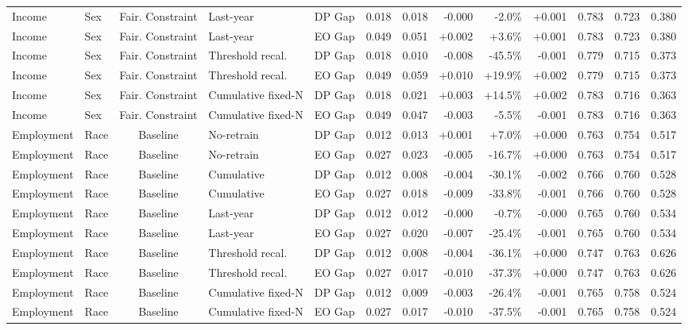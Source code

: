 \begin{longtable}{llcllrrrrrrrr}
Income & Sex & Fair. Constraint & Last-year & DP Gap & 0.018 & 0.018 & -0.000 & -2.0\% & +0.001 & 0.783 & 0.723 & 0.380 \\
Income & Sex & Fair. Constraint & Last-year & EO Gap & 0.049 & 0.051 & +0.002 & +3.6\% & +0.001 & 0.783 & 0.723 & 0.380 \\
Income & Sex & Fair. Constraint & Threshold recal. & DP Gap & 0.018 & 0.010 & -0.008 & -45.5\% & -0.001 & 0.779 & 0.715 & 0.373 \\
Income & Sex & Fair. Constraint & Threshold recal. & EO Gap & 0.049 & 0.059 & +0.010 & +19.9\% & +0.002 & 0.779 & 0.715 & 0.373 \\
Income & Sex & Fair. Constraint & Cumulative fixed-N & DP Gap & 0.018 & 0.021 & +0.003 & +14.5\% & +0.002 & 0.783 & 0.716 & 0.363 \\
Income & Sex & Fair. Constraint & Cumulative fixed-N & EO Gap & 0.049 & 0.047 & -0.003 & -5.5\% & -0.001 & 0.783 & 0.716 & 0.363 \\
Employment & Race & Baseline & No-retrain & DP Gap & 0.012 & 0.013 & +0.001 & +7.0\% & +0.000 & 0.763 & 0.754 & 0.517 \\
Employment & Race & Baseline & No-retrain & EO Gap & 0.027 & 0.023 & -0.005 & -16.7\% & +0.000 & 0.763 & 0.754 & 0.517 \\
Employment & Race & Baseline & Cumulative & DP Gap & 0.012 & 0.008 & -0.004 & -30.1\% & -0.002 & 0.766 & 0.760 & 0.528 \\
Employment & Race & Baseline & Cumulative & EO Gap & 0.027 & 0.018 & -0.009 & -33.8\% & -0.001 & 0.766 & 0.760 & 0.528 \\
Employment & Race & Baseline & Last-year & DP Gap & 0.012 & 0.012 & -0.000 & -0.7\% & -0.000 & 0.765 & 0.760 & 0.534 \\
Employment & Race & Baseline & Last-year & EO Gap & 0.027 & 0.020 & -0.007 & -25.4\% & -0.001 & 0.765 & 0.760 & 0.534 \\
Employment & Race & Baseline & Threshold recal. & DP Gap & 0.012 & 0.008 & -0.004 & -36.1\% & +0.000 & 0.747 & 0.763 & 0.626 \\
Employment & Race & Baseline & Threshold recal. & EO Gap & 0.027 & 0.017 & -0.010 & -37.3\% & +0.000 & 0.747 & 0.763 & 0.626 \\
Employment & Race & Baseline & Cumulative fixed-N & DP Gap & 0.012 & 0.009 & -0.003 & -26.4\% & -0.001 & 0.765 & 0.758 & 0.524 \\
Employment & Race & Baseline & Cumulative fixed-N & EO Gap & 0.027 & 0.017 & -0.010 & -37.5\% & -0.001 & 0.765 & 0.758 & 0.524 \\

\end{longtable}
